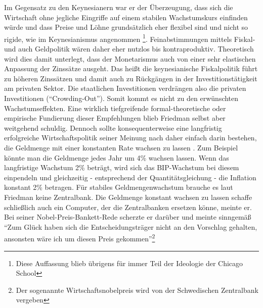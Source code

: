 Im Gegensatz zu den Keynesianern war er der Überzeugung, dass sich die Wirtschaft ohne jegliche Eingriffe auf einem stabilen Wachstumskurs einfinden würde und dass Preise und Löhne grundsätzlich eher flexibel sind und nicht so rigide, wie im Keynesianismus angenommen \footnote{Diese Auffassung blieb übrigens für immer Teil der Ideologie der Chicago School}. Feinabstimmungen mittels Fiskal- und auch Geldpolitik wären daher eher nutzlos bis kontraproduktiv. Theoretisch wird dies damit unterlegt, dass der Monetarismus auch von einer sehr elastischen Anpassung der Zinssätze ausgeht. Das heißt die keynesianische Fiskalpolitik führt zu höheren Zinssätzen und damit auch zu Rückgängen in der Investitionstätigkeit am privaten Sektor. Die staatlichen Investitionen verdrängen also die privaten Investitionen ("`Crowding-Out"'). Somit kommt es nicht zu den erwünschten Wachstumseffekten. Eine wirklich tiefgreifende formal-theoretische oder empirische Fundierung dieser Empfehlungen blieb Friedman selbst aber weitgehend schuldig.
Dennoch sollte konsequenterweise eine langfristig erfolgreiche Wirtschaftspolitik seiner Meinung nach daher einfach darin bestehen, die Geldmenge mit einer konstanten Rate wachsen zu lassen \parencite{Friedman1960}. Zum Beispiel könnte man die Geldmenge jedes Jahr um 4\% wachsen lassen. Wenn das langfristige Wachstum 2\% beträgt, wird sich das BIP-Wachstum bei diesem einpendeln und gleichzeitig - entsprechend der Quantitätsgleichung - die Inflation konstant 2\% betragen. Für stabiles Geldmengenwachstum brauche es laut Friedman keine Zentralbank. Die Geldmenge konstant wachsen zu lassen schaffe schließlich auch ein Computer, der die Zentralbanken ersetzen könne, meinte er. Bei seiner Nobel-Preis-Bankett-Rede \parencite{Friedman1976b} scherzte er darüber und meinte sinngemäß "`Zum Glück haben sich die Entscheidungsträger nicht an den Vorschlag gehalten, ansonsten wäre ich um diesen Preis gekommen"'\footnote{Der sogenannte Wirtschaftsnobelpreis wird von der Schwedischen Zentralbank vergeben}

